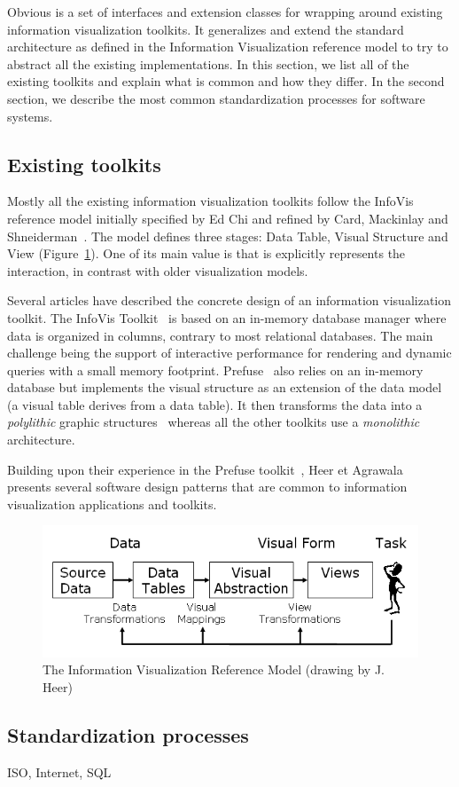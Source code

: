Obvious is a set of interfaces and extension classes for wrapping
around existing information visualization toolkits.  It generalizes
and extend the standard architecture as defined in the Information
Visualization reference model to try to abstract all the existing
implementations.  In this section, we list all of the existing
toolkits and explain what is common and how they differ.  In the
second section, we describe the most common standardization processes
for software systems.

\subsection{Existing toolkits}

Mostly all the existing information visualization toolkits follow the
InfoVis reference model initially specified by Ed Chi and refined by
Card, Mackinlay and Shneiderman~\cite{ChiRefModel,ReadingsIV}.  The
model defines three stages: Data Table, Visual Structure and View
(Figure~\ref{fig:refmodel}).  One of its main value is that is
explicitly represents the interaction, in contrast with older
visualization models.

Several articles have described the concrete design of an information
visualization toolkit.  The InfoVis Toolkit~\cite{InfoVis} is based on
an in-memory database manager where data is organized in columns,
contrary to most relational databases.  The main challenge being the
support of interactive performance for rendering and dynamic queries
with a small memory footprint.  Prefuse~\cite{Prefuse} also relies on
an in-memory database but implements the visual structure as an
extension of the data model (a visual table derives from a data
table).  It then transforms the data into a \emph{polylithic} graphic
structures~\cite{Polylithic} whereas all the other toolkits use a
\emph{monolithic} architecture.  


Building upon their experience in the
Prefuse toolkit~\cite{Prefuse}, Heer et Agrawala~\cite{DesignPatternsIV}
presents several software design patterns that are common to
information visualization applications and toolkits.

\begin{figure}
\includegraphics[width=\columnwidth]{figures/reference_model}
\caption{The Information Visualization Reference Model (drawing by
  J. Heer)}
\label{fig:refmodel}
\end{figure}

\cite{DesignPatternsIV}

\subsection{Standardization processes}
ISO, Internet, SQL





